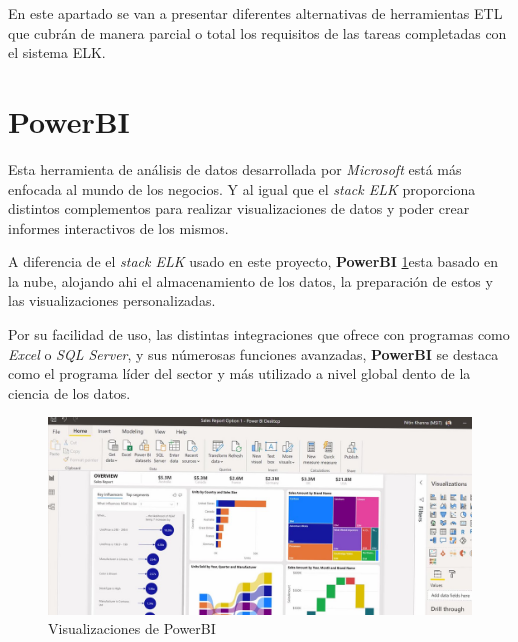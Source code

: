 
En este apartado se van a presentar diferentes alternativas de herramientas ETL que cubrán de manera parcial o total los requisitos de las tareas completadas con el sistema ELK.

\section{PowerBI}
Esta herramienta de análisis de datos desarrollada por \textit{Microsoft} está más enfocada al mundo de los negocios\cite{PowerBI}. Y al igual que el \textit{stack ELK} proporciona distintos complementos para realizar visualizaciones de datos y poder crear informes interactivos de los mismos.

A diferencia de el \textit{stack ELK } usado en este proyecto, \textbf{PowerBI} \ref{fig:powerbi}esta basado en la nube, alojando ahi el almacenamiento de los datos, la preparación de estos y las visualizaciones personalizadas.

Por su facilidad de uso, las distintas integraciones que ofrece con programas como \textit{Excel} o \textit{SQL Server}, y sus númerosas funciones avanzadas, \textbf{PowerBI} se destaca como el programa líder del sector y más utilizado a nivel global dento de la ciencia de los datos.

\begin{figure}
    \centering
    \includegraphics[width=1\linewidth]{img/powerbi.jpg}
    \caption{Visualizaciones de PowerBI \cite{PowerBii}}
    \label{fig:powerbi}
\end{figure}

\paragraph{            }
\paragraph{            }
